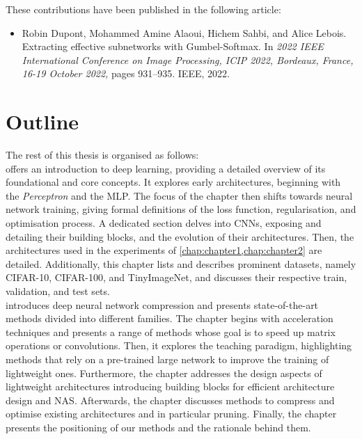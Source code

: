 \noindent These contributions have been published in the following article:
\begin{itemize}
      \item Robin Dupont, Mohammed Amine Alaoui, Hichem Sahbi, and Alice
            Lebois. Extracting effective subnetworks with Gumbel-Softmax. In \textit{2022
                  IEEE International Conference on Image Processing, ICIP 2022, Bordeaux,
                  France, 16-19 October 2022,} pages 931–935. IEEE, 2022.\\
\end{itemize}

\section{Outline}

The rest of this thesis is organised as follows:\\

 offers an introduction to deep learning, providing a detailed
overview of its foundational and core concepts. It explores early architectures,
beginning with the \emph{Perceptron} and the \ac{MLP}. The focus of the chapter
then shifts towards neural network training, giving formal definitions of the
loss function, regularisation, and optimisation process. A dedicated section
delves into \aclp{CNN}, exposing and detailing their building blocks, and the
evolution of their architectures. Then, the architectures used in the
experiments of \cref{chap:chapter1,chap:chapter2} are detailed. Additionally,
this chapter lists and describes prominent datasets, namely CIFAR-10, CIFAR-100,
and TinyImageNet, and discusses their respective train, validation, and test
sets.\\

 introduces deep neural network compression and presents
state-of-the-art methods divided into different families. The chapter begins
with acceleration techniques and presents a range of methods whose goal is to
speed up matrix operations or convolutions. Then, it explores the teaching
paradigm, highlighting methods that rely on a pre-trained large network to
improve the training of lightweight ones. Furthermore, the chapter addresses the
design aspects of lightweight architectures introducing building blocks for
efficient architecture design and \acl{NAS}. Afterwards, the chapter discusses
methods to compress and optimise existing architectures and in particular
pruning. Finally, the chapter presents the positioning of our methods and the
rationale behind them.\\

